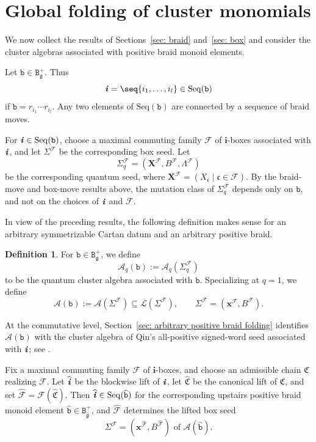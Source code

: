 \documentclass[12pt, leqno]{amsart}
\numberwithin{equation}{section}
\theoremstyle{plain}
\theoremstyle{definition}
\newtheorem{definition}[lemma]{Definition}
\newcommand{\seteq}{\mathbin{:=}}
\newcommand{\g}{\mathfrak{g}}
\newcommand{\La}{\Lambda}
\newcommand{\ii}{ \textbf{\textit{i}}}
\newcommand{\hg}{{\widehat{\g}}}
\newcommand{\hii}{{\widehat{\ii}}}
\newcommand{\frakC}{\mathfrak{C}}
\newcommand{\frakc}{\mathfrak{c}}
\newcommand{\hfrakC}{\widehat{\frakC}}
\newcommand{\bfX}{\mathbf{X}}
\newcommand{\bfi}{\mathbf{i}}
\newcommand{\bfx}{\mathbf{x}}
\newcommand{\calA}{\mathcal{A}}
\newcommand{\calF}{\mathcal{F}}
\newcommand{\calL}{\mathcal{L}}
\newcommand{\hcalF}{{\widehat{\calF}}}
\newcommand{\ttB}{\mathtt{B}}
\newcommand{\ttb}{\mathtt{b}}
\newcommand{\httb}{\widehat{\ttb}}
\newcommand{\Seq}{\mathrm{Seq}}
\begin{document}
\section{Global folding of cluster monomials} \label{sec: global folding}

We now collect the results of Sections~\ref{sec: braid} and~\ref{sec: box} and consider the
cluster algebras associated with positive braid monoid
elements.

Let $\ttb\in\ttB^+_\g$. Thus
\[
\ii=\seq{i_1,\ldots,i_l}\in\Seq(\ttb)
\]
if $\ttb=r_{i_1}\cdots r_{i_l}$.
Any two elements of $\Seq(\ttb)$ are connected by a sequence of
braid moves.

For $\ii\in\Seq(\ttb)$, choose a maximal commuting family $\calF$ of
$\bfi$-boxes associated with $\ii$, and let $\Sigma^\calF$ be the
corresponding box seed.  Let
\[
\Sigma_q^\calF=(\bfX^\calF,B^\calF,\La^\calF)
\]
be the corresponding quantum seed, where
$\bfX^\calF=(X_\frakc\mid\frakc\in\calF)$.
By the braid-move and box-move results above, the mutation class of
$\Sigma_q^\calF$ depends only on $\ttb$, and not on the choices of
$\ii$ and $\calF$.

In view of the preceding results, the following definition makes sense
for an arbitrary symmetrizable Cartan datum and an arbitrary positive
braid.

\begin{definition}\label{def: positive braid cluster algebra}
For $\ttb\in\ttB_\g^+$, we define
\[
\calA_q(\ttb) \seteq \calA_q(\Sigma_q^\calF)
\]
to be the quantum cluster algebra associated with $\ttb$.
Specializing at $q=1$, we define
\[
\calA(\ttb) \seteq \calA(\Sigma^\calF) \subseteq \calL(\Sigma^\calF), \qquad \Sigma^\calF=(\bfx^\calF,B^\calF).
\]
\end{definition}

At the commutative level, Section~\ref{sec: arbitrary positive braid folding}
identifies $\calA(\ttb)$ with the cluster algebra of Qin's all-positive
signed-word seed associated with $\ii$; see
\cite[Section~3.1]{Qin24B}.


Fix a maximal commuting family $\calF$ of $\bfi$-boxes, and choose an
admissible chain $\frakC$ realizing $\calF$.
 Let $\hii$ be the blockwise lift of $\ii$, let $\hfrakC$ be the
canonical lift of $\frakC$, and set $\hcalF=\calF(\hfrakC)$.{} Then
$\hii\in\Seq(\httb)$ for the corresponding upstairs positive braid
monoid element $\httb\in \ttB^+_\hg$, and $\hcalF$ determines the lifted
box seed
\[
\Sigma^\hcalF = (\bfx^\hcalF,B^\hcalF) \text{ of $\calA(\httb)$.}
\]
\end{document}
